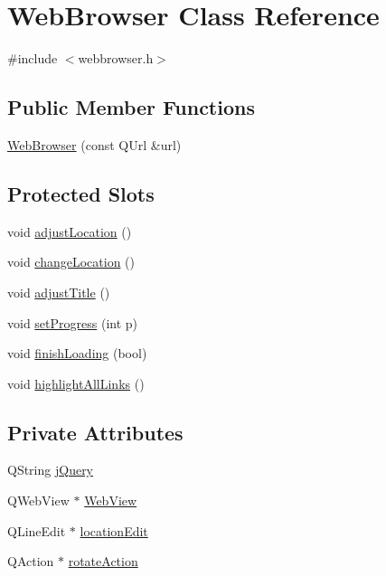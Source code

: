 \hypertarget{classWebBrowser}{
\section{WebBrowser Class Reference}
\label{classWebBrowser}
}


{\ttfamily \#include $<$webbrowser.h$>$}

\subsection*{Public Member Functions}
\begin{DoxyCompactItemize}
\item 
\hyperlink{classWebBrowser_a57e874b70beb48faad0fa234911292f2}{WebBrowser} (const QUrl \&url)
\end{DoxyCompactItemize}
\subsection*{Protected Slots}
\begin{DoxyCompactItemize}
\item 
void \hyperlink{classWebBrowser_a3163f7fba97a679546f337f522425de2}{adjustLocation} ()
\item 
void \hyperlink{classWebBrowser_a019b509364eddb9a97849c0cc280c0d1}{changeLocation} ()
\item 
void \hyperlink{classWebBrowser_abf934236fb5f9e8d588935e92e05b590}{adjustTitle} ()
\item 
void \hyperlink{classWebBrowser_a2dfe3602f9038c77cb9952f62651948b}{setProgress} (int p)
\item 
void \hyperlink{classWebBrowser_ad5e406fd329da7e05e1de3bbb786eb5b}{finishLoading} (bool)
\item 
void \hyperlink{classWebBrowser_afd425096d85a3e79cff09af427e73dcf}{highlightAllLinks} ()
\end{DoxyCompactItemize}
\subsection*{Private Attributes}
\begin{DoxyCompactItemize}
\item 
QString \hyperlink{classWebBrowser_a24491d38505f561e1b8e19fda935b846}{jQuery}
\item 
QWebView $\ast$ \hyperlink{classWebBrowser_aca7125e85b1c317dc6e49e7aa76ec87f}{WebView}
\item 
QLineEdit $\ast$ \hyperlink{classWebBrowser_ae902e67fcb201863444d1edef801a662}{locationEdit}
\item 
QAction $\ast$ \hyperlink{classWebBrowser_a72affcc10a896cc9684c6187058077b8}{rotateAction}
\end{DoxyCompactItemize}


